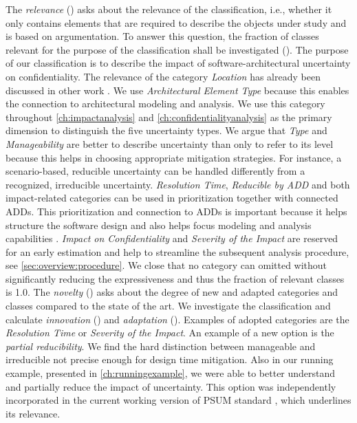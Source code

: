 The \emph{relevance} () asks about the relevance of the classification, i.e., whether it only contains elements that are required to describe the objects under study and is based on argumentation.
To answer this question, the fraction of classes relevant for the purpose of the classification shall be investigated ().
The purpose of our classification is to describe the impact of software-architectural uncertainty on confidentiality.
The relevance of the category \emph{Location} has already been discussed in other work \cite{bures_capturing_2020,perez-palacin_uncertainties_2014}.
We use \emph{Architectural Element Type} because this enables the connection to architectural modeling and analysis.
We use this category throughout \autoref{ch:impactanalysis} and \autoref{ch:confidentialityanalysis} as the primary dimension to distinguish the five uncertainty types.
We argue that \emph{Type} and \emph{Manageability} are better to describe uncertainty than only to refer to its level because this helps in choosing appropriate mitigation strategies.
For instance, a scenario-based, reducible uncertainty can be handled differently from a recognized, irreducible uncertainty.
\emph{Resolution Time}, \emph{Reducible by ADD} and both impact-related categories can be used in prioritization together with connected \acp{ADD}.
This prioritization and connection to \acp{ADD} is important because it helps structure the software design and also helps focus modeling and analysis capabilities \cite{kruchten_ontology_2004}.
\emph{Impact on Confidentiality} and \emph{Severity of the Impact} are reserved for an early estimation and help to streamline the subsequent analysis procedure, see \autoref{sec:overview:procedure}.
We close that no category can omitted without significantly reducing the expressiveness and thus the fraction of relevant classes is 1.0.
The \emph{novelty} () asks about the degree of new and adapted categories and classes compared to the state of the art.
We investigate the classification and calculate \emph{innovation} () and \emph{adaptation} ().
Examples of adopted categories are the \emph{Resolution Time} or \emph{Severity of the Impact}.
An example of a new option is the \emph{partial reducibility}.
We find the hard distinction between manageable and irreducible not precise enough for design time mitigation.
Also in our running example, presented in \autoref{ch:runningexample}, we were able to better understand and partially reduce the impact of uncertainty.
This option was independently incorporated in the current working version of \acf{PSUM} standard \cite{PSUM}, which underlines its relevance.
